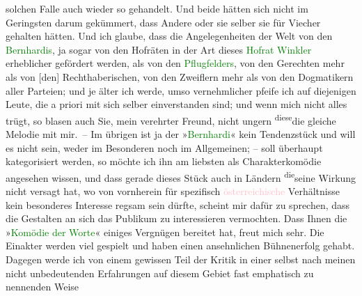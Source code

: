                solchen Falle auch wieder so gehandelt. Und beide hätten sich nicht im Geringsten
               darum gekümmert, dass Andere oder sie selber sie für Viecher gehalten hätten. Und ich
               glaube, dass die \introOben{}Angelegenheiten der\introOben{} Welt von den \textcolor{green}{Bernhardis}{},{\pb} ja sogar von den Hofräten in der Art dieses \textcolor{green}{Hofrat Winkler}{} erheblicher
               gefördert werden, als von den \textcolor{green}{Pflugfelders}{}, von \introOben{}den\introOben{} Gerechten mehr als von
                  {[}den{]} Rechthaberischen, von den Zweiflern mehr als von den
               Dogmatikern aller Parteien\introOben{};\introOben{} und je älter ich werde, umso
               vernehmlicher pfeife ich auf diejenigen Leute, die a
               priori mit sich selber einverstanden sind; und wenn mich nicht alles trügt, so blasen
               auch Sie, mein verehrter Freund, nicht ungern \substVorne{}\textsuperscript{diese}\substDazwischen{}die gleiche\substHinten{} Melodie \introOben{}mit mir\introOben{}. – Im übrigen ist ja der »\textcolor{green}{Bernhardi}{}\ledrightnote{\textcolor{green}{Professor Bernhardi. Komödie in fünf Akten}}« kein Tendenzstück und will es nicht sein,
               weder im Besonderen noch im Allgemeinen; – soll überhaupt kategorisiert werden, so
               möchte ich ihn am liebsten als Charakterkomödie angesehen wissen, und dass gerade
               dieses Stück auch in Ländern \substVorne{}\textsuperscript{die}\substDazwischen{}seine\substHinten{} Wirkung nicht versagt hat, wo von vornherein für spezifisch \textcolor{pink}{österreichische}{}\ledrightnote{\textcolor{pink}{Österreich}} Verhältnisse kein besonderes Interesse regsam
               sein dürfte, scheint mir dafür zu sprechen, dass die Gestalten an sich das Publikum
               zu interessieren vermochten.\pend
           \pstart
           {\pb}Dass Ihnen die »\textcolor{green}{Komödie der Worte}{}\ledrightnote{\textcolor{green}{Komödie der Worte. Drei Einakter}}« einiges Vergnügen bereitet hat, freut mich sehr. Die
               Einakter werden viel gespielt und haben einen ansehnlichen Bühnenerfolg gehabt.
               Dagegen werde ich von einem gewissen Teil der Kritik in einer selbst nach meinen
               nicht unbedeutenden Erfahrungen auf diesem Gebiet fast emphatisch zu nennenden Weise

